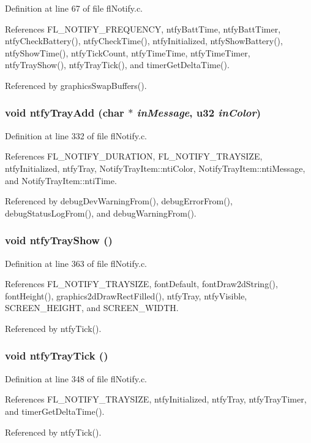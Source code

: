 Definition at line 67 of file fl\-Notify.c.

References FL\_\-NOTIFY\_\-FREQUENCY, ntfy\-Batt\-Time, ntfy\-Batt\-Timer, ntfy\-Check\-Battery(), ntfy\-Check\-Time(), ntfy\-Initialized, ntfy\-Show\-Battery(), ntfy\-Show\-Time(), ntfy\-Tick\-Count, ntfy\-Time\-Time, ntfy\-Time\-Timer, ntfy\-Tray\-Show(), ntfy\-Tray\-Tick(), and timer\-Get\-Delta\-Time().

Referenced by graphics\-Swap\-Buffers().
\subsubsection{\setlength{\rightskip}{0pt plus 5cm}void ntfy\-Tray\-Add (char $\ast$ {\em in\-Message}, u32 {\em in\-Color})}\label{flNotify_8h_9a5dce75d9d2b20e3ce17d8f4f80e278}




Definition at line 332 of file fl\-Notify.c.

References FL\_\-NOTIFY\_\-DURATION, FL\_\-NOTIFY\_\-TRAYSIZE, ntfy\-Initialized, ntfy\-Tray, Notify\-Tray\-Item::nti\-Color, Notify\-Tray\-Item::nti\-Message, and Notify\-Tray\-Item::nti\-Time.

Referenced by debug\-Dev\-Warning\-From(), debug\-Error\-From(), debug\-Status\-Log\-From(), and debug\-Warning\-From().
\subsubsection{\setlength{\rightskip}{0pt plus 5cm}void ntfy\-Tray\-Show ()}\label{flNotify_8h_335d3a9276709c7fc08635f7555b1194}




Definition at line 363 of file fl\-Notify.c.

References FL\_\-NOTIFY\_\-TRAYSIZE, font\-Default, font\-Draw2d\-String(), font\-Height(), graphics2d\-Draw\-Rect\-Filled(), ntfy\-Tray, ntfy\-Visible, SCREEN\_\-HEIGHT, and SCREEN\_\-WIDTH.

Referenced by ntfy\-Tick().
\subsubsection{\setlength{\rightskip}{0pt plus 5cm}void ntfy\-Tray\-Tick ()}\label{flNotify_8h_62e1c6f0194cee8e8505f76ef8b1e168}




Definition at line 348 of file fl\-Notify.c.

References FL\_\-NOTIFY\_\-TRAYSIZE, ntfy\-Initialized, ntfy\-Tray, ntfy\-Tray\-Timer, and timer\-Get\-Delta\-Time().

Referenced by ntfy\-Tick().